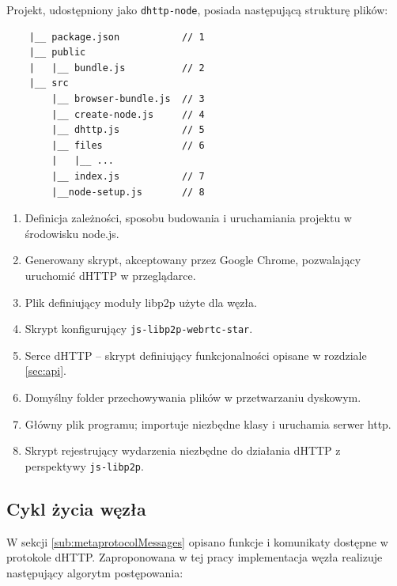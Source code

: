 Projekt, udostępniony jako \texttt{dhttp-node}, posiada następującą strukturę plików:
\begin{lstlisting}
    |__ package.json           // 1
    |__ public
    |   |__ bundle.js          // 2
    |__ src
        |__ browser-bundle.js  // 3
        |__ create-node.js     // 4
        |__ dhttp.js           // 5
        |__ files              // 6
        |   |__ ...
        |__ index.js           // 7
        |__node-setup.js       // 8
\end{lstlisting}

\begin{enumerate}[noitemsep]
    \item Definicja zależności, sposobu budowania i uruchamiania projektu w środowisku node.js.
    \item Generowany skrypt, akceptowany przez Google Chrome, pozwalający uruchomić dHTTP w przeglądarce.
    \item Plik definiujący moduły libp2p użyte dla węzła.
    \item Skrypt konfigurujący \texttt{js-libp2p-webrtc-star}.
    \item Serce dHTTP -- skrypt definiujący funkcjonalności opisane w rozdziale \ref{sec:api}.
    \item Domyślny folder przechowywania plików w przetwarzaniu dyskowym.
    \item Główny plik programu; importuje niezbędne klasy i uruchamia serwer http.
    \item Skrypt rejestrujący wydarzenia niezbędne do działania dHTTP z perspektywy \texttt{js-libp2p}.
\end{enumerate}

\subsection{Cykl życia węzła}
\label{sec:transportAlgorithm}

W sekcji \ref{sub:metaprotocolMessages} opisano funkcje i komunikaty dostępne w protokole dHTTP. Zaproponowana w tej pracy implementacja węzła realizuje następujący algorytm postępowania:

